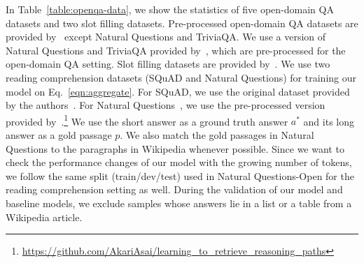 \documentclass[11pt,a4paper]{article}
\begin{document}
\begin{table}[t]
\label{table:dataset}
\begin{center}
\centering
{}
\end{center}
\caption{Statistics of five open-domain QA datasets and two slot filling datasets. We follow the same splits in open-domain QA for the two reading comprehension datasets (SQuAD and Natural Questions).}\vspace{-0.3cm}\label{table:openqa-data}
\end{table}
 In Table~\ref{table:openqa-data}, we show the statistics of five open-domain QA datasets and two slot filling datasets.
Pre-processed open-domain QA datasets are provided by~\citet{chen2017reading} except Natural Questions and TriviaQA.
We use a version of Natural Questions and TriviaQA provided by~\citet{min2019discrete,lee2019latent}, which are pre-processed for the open-domain QA setting.
Slot filling datasets are provided by~\citet{petroni2020kilt}.
We use two reading comprehension datasets (SQuAD and Natural Questions) for training our model on Eq.~\eqref{eqn:aggregate}.
For SQuAD, we use the original dataset provided by the authors~\citep{rajpurkar2016squad}.
For Natural Questions~\citep{kwiatkowski2019natural}, we use the pre-processed version provided by~\citet{asai2019learning}.\footnote{\url{https://github.com/AkariAsai/learning\_to\_retrieve\_reasoning\_paths}}
We use the short answer as a ground truth answer $a^*$ and its long answer as a gold passage $p$.
We also match the gold passages in Natural Questions to the paragraphs in Wikipedia whenever possible.
Since we want to check the performance changes of our model with the growing number of tokens, we follow the same split (train/dev/test) used in Natural Questions-Open for the reading comprehension setting as well.
During the validation of our model and baseline models, we exclude samples whose answers lie in a list or a table from a Wikipedia article.
\end{document}
